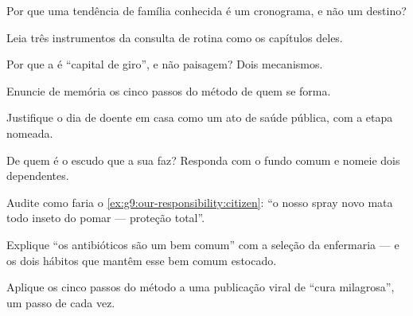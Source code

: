 \begin{exercise}[$\star$]\label{exo:g9:our-responsibility:3}
Por que uma tendência de família conhecida é um cronograma, e
não um destino?
\end{exercise}

\begin{exercise}[$\star$]\label{exo:g9:our-responsibility:4}
Leia três instrumentos da consulta de rotina como os
capítulos deles.
\end{exercise}

\begin{exercise}[$\star$]\label{exo:g9:our-responsibility:5}
Por que a  é ``capital de giro'', e não
paisagem? Dois mecanismos.
\end{exercise}

\begin{exercise}[$\star$]\label{exo:g9:our-responsibility:6}
Enuncie de memória os cinco passos do método de quem se
forma.
\end{exercise}

\begin{exercise}[$\star\star$]\label{exo:g9:our-responsibility:7}
Justifique o dia de doente em casa como um ato de saúde
pública, com a etapa nomeada.
\end{exercise}

\begin{exercise}[$\star\star$]\label{exo:g9:our-responsibility:8}
De quem é o escudo que a sua  faz? Responda com o
fundo comum e nomeie dois dependentes.
\end{exercise}

\begin{exercise}[$\star\star$]\label{exo:g9:our-responsibility:9}
Audite como faria o \cref{ex:g9:our-responsibility:citizen}:
``o nosso spray novo mata todo inseto do pomar --- proteção
total''.
\end{exercise}

\begin{exercise}[$\star\star$]\label{exo:g9:our-responsibility:10}
Explique ``os antibióticos são um bem comum'' com a seleção da
enfermaria --- e os dois hábitos que mantêm esse bem comum
estocado.
\end{exercise}

\begin{exercise}[$\star\star$]\label{exo:g9:our-responsibility:11}
Aplique os cinco passos do método a uma publicação viral de
``cura milagrosa'', um passo de cada vez.
\end{exercise}

